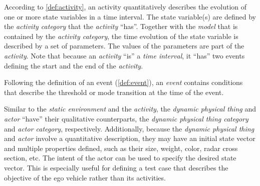 According to \cref{def:activity}, an activity quantitatively describes the evolution of one or more state variables in a time interval. The state variable(s) are defined by the \textit{activity category} that the \textit{activity} ``has''. Together with the \textit{model} that is contained by the \textit{activity category}, the time evolution of the state variable is described by a set of parameters. The values of the parameters are part of the \textit{activity}. 
\cstartb Note that because an \textit{activity} ``is'' a \textit{time interval}, it ``has'' two events defining the start and the end of the \textit{activity}. \cendb


Following the definition of an event (\cref{def:event}), an \textit{event} contains conditions that describe the threshold or mode transition at the time of the event.

Similar to the \textit{static environment} and the \textit{activity}, the \cstartb\textit{dynamic physical thing} and \textit{actor} ``have'' their qualitative counterparts, the \textit{dynamic physical thing category} and \textit{actor category}, respectively. Additionally, because the \textit{dynamic physical thing} and \textit{actor} involve a quantitative description, they may have an initial state vector and multiple properties defined, such as their \cendb size, weight, color, radar cross section, etc. \cstartb The intent of the actor can be used to specify the desired state vector. \cendb This is especially useful for defining a test case that describes the objective of the ego vehicle rather than its activities. 

